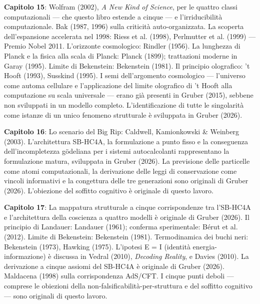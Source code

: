 \documentclass[11pt, twoside, openright]{book}
\begin{document}
\textbf{Capitolo 15}: Wolfram (2002), \textit{A New Kind of Science}, per le quattro classi computazionali --- che questo libro estende a cinque --- e l'irriducibilità computazionale. Bak (1987, 1996) sulla criticità auto-organizzata. La scoperta dell'espansione accelerata nel 1998: Riess et al. (1998), Perlmutter et al. (1999) --- Premio Nobel 2011. L'orizzonte cosmologico: Rindler (1956). La lunghezza di Planck e la fisica alla scala di Planck: Planck (1899); trattazioni moderne in Garay (1995). Limite di Bekenstein: Bekenstein (1981). Il principio olografico: 't Hooft (1993), Susskind (1995). I semi dell'argomento cosmologico --- l'universo come automa cellulare e l'applicazione del limite olografico di 't Hooft alla computazione su scala universale --- erano già presenti in Gruber (2015), sebbene non sviluppati in un modello completo. L'identificazione di tutte le singolarità come istanze di un unico fenomeno strutturale è sviluppata in Gruber (2026).

\textbf{Capitolo 16}: Lo scenario del Big Rip: Caldwell, Kamionkowski \& Weinberg (2003). L'architettura SB-HC4A, la formulazione a punto fisso e la conseguenza dell'incompletezza gödeliana per i sistemi autocalcolanti rappresentano la formulazione matura, sviluppata in Gruber (2026). La previsione delle particelle come atomi computazionali, la derivazione delle leggi di conservazione come vincoli informativi e la congettura delle tre generazioni sono originali di Gruber (2026). L'obiezione del soffitto cognitivo è originale di questo lavoro.

\textbf{Capitolo 17}: La mappatura strutturale a cinque corrispondenze tra l'SB-HC4A e l'architettura della coscienza a quattro modelli è originale di Gruber (2026). Il principio di Landauer: Landauer (1961); conferma sperimentale: Bérut et al. (2012). Limite di Bekenstein: Bekenstein (1981). Termodinamica dei buchi neri: Bekenstein (1973), Hawking (1975). L'ipotesi E = I (identità energia-informazione) è discussa in Vedral (2010), \textit{Decoding Reality}, e Davies (2010). La derivazione a cinque assiomi del SB-HC4A è originale di Gruber (2026). Maldacena (1998) sulla corrispondenza AdS/\allowbreak{}CFT. I cinque punti deboli --- comprese le obiezioni della non-falsificabilità-per-struttura e del soffitto cognitivo --- sono originali di questo lavoro.
\end{document}
